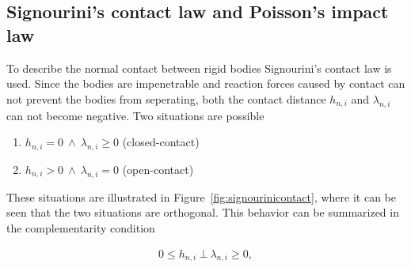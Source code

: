 \documentclass[DC2017114Bouma.tex]{subfiles}
\begin{document}
\subsection{Signourini's contact law and Poisson's impact law}
To describe the normal contact between rigid bodies Signourini's contact law is used. Since the bodies are impenetrable and reaction forces caused by contact can not prevent the bodies from seperating, both the contact distance $h_{n,i}$ and $\lambda_{n,i}$ can not become negative. Two situations are possible

\begin{enumerate}
\item $h_{n,i}=0\ \wedge\ \lambda_{n,i} \geq 0$ (closed-contact)
\item $h_{n,i}>0\ \wedge\ \lambda_{n,i} = 0$ (open-contact)
\end{enumerate}

These situations are illustrated in Figure~\ref{fig:signourinicontact}, where it can be seen that the two situations are orthogonal. This behavior can be summarized in the complementarity condition

\begin{align}
0\leq h_{n,i}\ \bot\ \lambda_{n,i} \geq 0,\label{eq:signourini}
\end{align}
\end{document}
